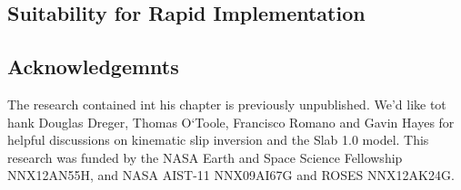\subsection{Suitability for Rapid Implementation}

\subsection{Acknowledgemnts}

The research contained int his chapter is previously unpublished. We'd like tot hank Douglas Dreger, Thomas O`Toole, Francisco Romano and Gavin Hayes for helpful discussions on kinematic slip inversion and the Slab 1.0 model. This research was funded by the NASA Earth and Space Science Fellowship NNX12AN55H, and NASA AIST-11 NNX09AI67G and ROSES NNX12AK24G.

